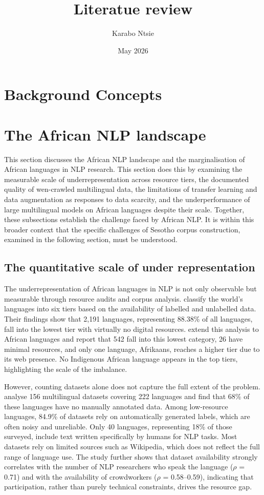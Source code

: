 \documentclass[11pt,a4paper]{article}
\begin{document}
	
\title{Literatue review }
\author{ Karabo Ntsie }
\date {May 2026}
\maketitle

\section{Background Concepts}

\section{The African NLP landscape}
This section discusses the African NLP landscape and the marginalisation of African languages in NLP research. This section does this by examining the measurable scale of underrepresentation across resource tiers, the documented quality of wen-crawled multilingual data, the limitations of transfer learning and data augmentation as responses to data scarcity, and the underperformance of large multilingual models on African languages despite their scale. Together, these subsections establish the challenge faced by African NLP. It is within this broader context that the specific challenges of Sesotho corpus construction, examined in the following section, must be understood.

\subsection{The quantitative scale of under representation}
The underrepresentation of African languages in NLP is not only observable but measurable through resource audits and corpus analysis. \citet{joshi2020state} classify the world’s languages into six tiers based on the availability of labelled and unlabelled data. Their findings show that 2,191 languages, representing 88.38\% of all languages, fall into the lowest tier with virtually no digital resources. \citet{adebara2022towards} extend this analysis to African languages and report that 542 fall into this lowest category, 26 have minimal resources, and only one language, Afrikaans, reaches a higher tier due to its web presence. No Indigenous African language appears in the top tiers, highlighting the scale of the imbalance.

However, counting datasets alone does not capture the full extent of the problem. \citet{yu2022beyond} analyse 156 multilingual datasets covering 222 languages and find that 68\% of these languages have no manually annotated data. Among low-resource languages, 84.9\% of datasets rely on automatically generated labels, which are often noisy and unreliable. Only 40 languages, representing 18\% of those surveyed, include text written specifically by humans for NLP tasks. Most datasets rely on limited sources such as Wikipedia, which does not reflect the full range of language use. The study further shows that dataset availability strongly correlates with the number of NLP researchers who speak the language ($\rho$ = 0.71) and with the availability of crowdworkers ($\rho$ = 0.58–0.59), indicating that participation, rather than purely technical constraints, drives the resource gap.
\end{document}
